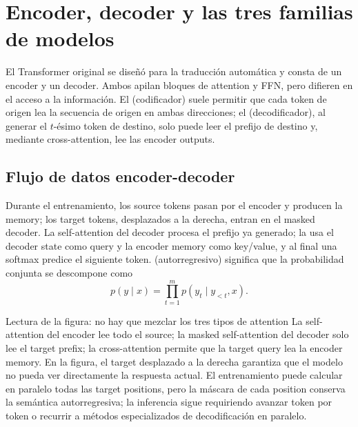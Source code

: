 \section{Encoder, decoder y las tres familias de modelos}

El Transformer original se diseñó para la traducción automática y consta de un encoder y un decoder. Ambos apilan bloques de attention y FFN, pero difieren en el acceso a la información. El  (codificador) suele permitir que cada token de origen lea la secuencia de origen en ambas direcciones; el  (decodificador), al generar el $t$-ésimo token de destino, solo puede leer el prefijo de destino y, mediante cross-attention, lee las encoder outputs.

\subsection{Flujo de datos encoder-decoder}

Durante el entrenamiento, los source tokens pasan por el encoder y producen la memory; los target tokens, desplazados a la derecha, entran en el masked decoder. La self-attention del decoder procesa el prefijo ya generado; la  usa el decoder state como query y la encoder memory como key/value, y al final una softmax predice el siguiente token.  (autorregresivo) significa que la probabilidad conjunta se descompone como
\[
p(y\mid x)=\prod_{t=1}^{m}p(y_t\mid y_{<t},x).
\]


\begin{knowledgebox}{Lectura de la figura: no hay que mezclar los tres tipos de attention}
La self-attention del encoder lee todo el source; la masked self-attention del decoder solo lee el target prefix; la cross-attention permite que la target query lea la encoder memory. En la figura, el target desplazado a la derecha garantiza que el modelo no pueda ver directamente la respuesta actual. El entrenamiento puede calcular en paralelo todas las target positions, pero la máscara de cada position conserva la semántica autorregresiva; la inferencia sigue requiriendo avanzar token por token o recurrir a métodos especializados de decodificación en paralelo.
\end{knowledgebox}

